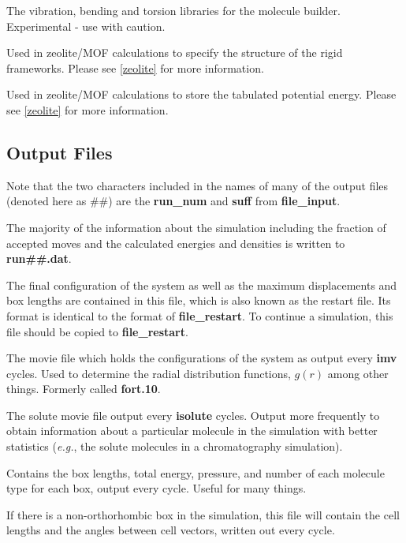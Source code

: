 \documentclass[12pt,letterpaper]{article}
\begin{document}
 The vibration,
bending and torsion libraries for the molecule builder.
Experimental - use with caution.

 Used
in zeolite/MOF calculations to specify the structure of the
rigid frameworks. Please see \ref{zeolite} for more
information.

 Used in zeolite/MOF calculations
to store the tabulated potential energy. Please see
\ref{zeolite} for more information.

\subsection{Output Files}
\label{output}
Note that the two characters included in the names of many
of the output files (denoted here as \#\#) are the {\bf
  run\_num} and {\bf suff} from {\bf file\_input}.

 The majority of the information
about the simulation including the fraction of accepted
moves and the calculated energies and densities is written
to {\bf run\#\#.dat}.

 The final configuration of the
system as well as the maximum displacements and box lengths
are contained in this file, which is also known as the
restart file. Its format is identical to the format of {\bf
  file\_restart}. To continue a simulation, this file should
be copied to {\bf file\_restart}.

 The movie file which holds the
configurations of the system as output every {\bf imv}
cycles. Used to determine the radial distribution functions,
$g(r)$ among other things. Formerly called {\bf fort.10}.

 The solute movie file output
every {\bf isolute} cycles. Output more frequently to obtain
information about a particular molecule in the simulation
with better statistics ({\it e.g.}, the solute molecules in
a chromatography simulation).

 Contains the box lengths, total
energy, pressure, and number of each molecule type for each
box, output every cycle. Useful for many things.

 If there is a
non-orthorhombic box in the simulation, this file will
contain the cell lengths and the angles between cell
vectors, written out every cycle.
\end{document}
